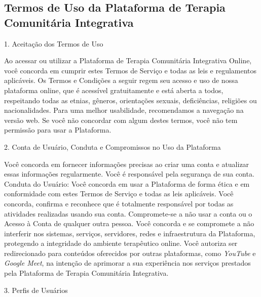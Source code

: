 \begin{apendicesenv}

\partapendices
     \chapter{Termos de Uso da Plataforma de Terapia Comunitária Integrativa}
     \label{appendix:Termos de Uso}
        1. Aceitação dos Termos de Uso
        
        Ao acessar ou utilizar a Plataforma de Terapia Comunitária Integrativa Online, você concorda em cumprir estes Termos de Serviço e todas as leis e regulamentos aplicáveis. Os Termos e Condições a seguir regem seu acesso e uso de nossa plataforma online, que é acessível gratuitamente e está aberta a todos, respeitando todas as etnias, gêneros, orientações sexuais, deficiências, religiões ou nacionalidades. Para uma melhor usabilidade, recomendamos a navegação na versão web. Se você não concordar com algum destes termos, você não tem permissão para usar a Plataforma.
        
        2. Conta de Usuário, Conduta e Compromissos no Uso da Plataforma
        
        Você concorda em fornecer informações precisas ao criar uma conta e atualizar essas informações regularmente. Você é responsável pela segurança de sua conta.
        Conduta do Usuário: Você concorda em usar a Plataforma de forma ética e em conformidade com estes Termos de Serviço e todas as leis aplicáveis.
        Você concorda, confirma e reconhece que é totalmente responsável por todas as atividades realizadas usando sua conta. Compromete-se a não usar a conta ou o Acesso à Conta de qualquer outra pessoa.
        Você concorda e se compromete a não interferir nos sistemas, serviços, servidores, redes e infraestrutura da Plataforma, protegendo a integridade do ambiente terapêutico online.
        Você autoriza ser redirecionado para conteúdos oferecidos por outras plataformas, como \textit{YouTube} e \textit{Google Meet}, na intenção de aprimorar a sua experiência nos serviços prestados pela Plataforma de Terapia Comunitária Integrativa.
        
        3. Perfis de Usuários
        

\end{apendicesenv}
